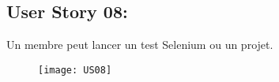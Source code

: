 \newpage
\subsection{User Story 08:}
Un membre peut lancer un test Selenium ou un projet.


\begin{figure}[!h]
  \begin{center}
        \texttt{[image: US08]}
        \label{US08-dia}
  \end{center}
\end{figure}